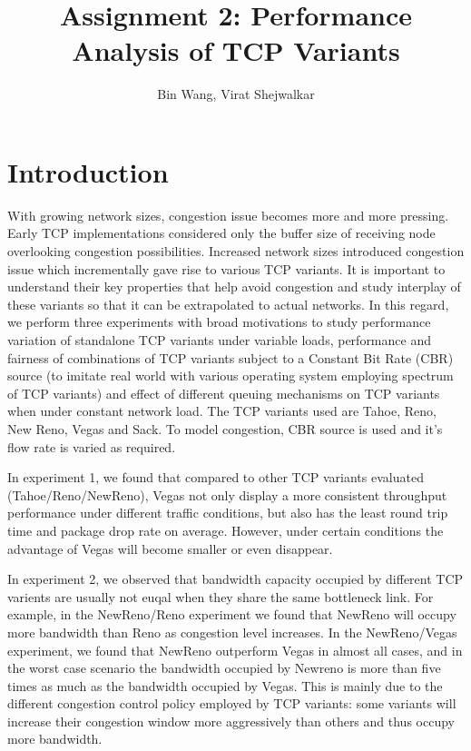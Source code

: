 \documentclass[USenglish,oneside,twocolumn]{article}
\begin{document}
 
\author[1]{Bin Wang, Virat Shejwalkar}

\title{\Large Assignment 2: Performance Analysis of TCP Variants}


  
 

\maketitle
\section{Introduction}
With growing network sizes, congestion issue becomes more and more pressing. Early TCP implementations considered only the buffer size of receiving node overlooking congestion possibilities. Increased network sizes introduced congestion issue which incrementally gave rise to various TCP variants. It is important to understand their key properties that help avoid congestion and study interplay of these variants so that it can be extrapolated to actual networks. In this regard, we perform three experiments with broad motivations to study performance variation of standalone TCP variants under variable loads, performance and fairness of combinations of TCP variants subject to a Constant Bit Rate (CBR) source (to imitate real world with various operating system employing spectrum of TCP variants) and effect of different queuing mechanisms on TCP variants when under constant network load. The TCP variants used are Tahoe, Reno, New Reno, Vegas and Sack. To model congestion, CBR source is used and it's flow rate is varied as required.

In experiment 1, we found that compared to other TCP variants evaluated (Tahoe/Reno/NewReno), Vegas not only display a more consistent throughput performance under different traffic conditions, but also has the least round trip time and package drop rate on average. However, under certain conditions the advantage of Vegas will become smaller or even disappear.

In experiment 2, we observed that bandwidth capacity occupied by different TCP varients are usually not euqal when they share the same bottleneck link. For example, in the NewReno/Reno experiment we found that NewReno will occupy more bandwidth than Reno as congestion level increases. In the NewReno/Vegas experiment, we found that NewReno outperform Vegas in almost all cases, and in the worst case scenario the bandwidth occupied by Newreno is more than five times as much as the bandwidth occupied by Vegas. This is mainly due to the different congestion control policy employed by TCP variants: some variants will increase their congestion window more aggressively than others and thus occupy more bandwidth.
\end{document}
